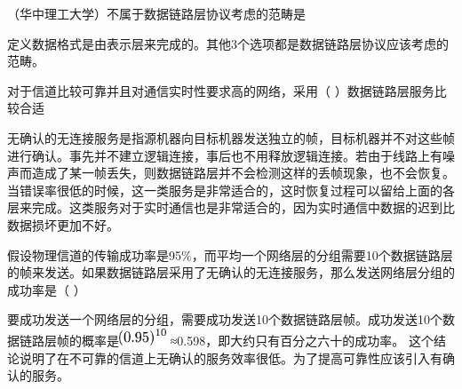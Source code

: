 \question （华中理工大学）不属于数据链路层协议考虑的范畴是
\par{}
\begin{solution}定义数据格式是由表示层来完成的。其他3个选项都是数据链路层协议应该考虑的范畴。
\end{solution}
\question 对于信道比较可靠并且对通信实时性要求高的网络，采用（
）数据链路层服务比较合适
\par{}
\begin{solution}无确认的无连接服务是指源机器向目标机器发送独立的帧，目标机器并不对这些帧进行确认。事先并不建立逻辑连接，事后也不用释放逻辑连接。若由于线路上有噪声而造成了某一帧丢失，则数据链路层并不会检测这样的丢帧现象，也不会恢复。当错误率很低的时候，这一类服务是非常适合的，这时恢复过程可以留给上面的各层来完成。这类服务对于实时通信也是非常适合的，因为实时通信中数据的迟到比数据损坏更加不好。
\end{solution}
\question 假设物理信道的传输成功率是95\%，而平均一个网络层的分组需要10个数据链路层的帧来发送。如果数据链路层采用了无确认的无连接服务，那么发送网络层分组的成功率是（
）
\par{}
\begin{solution}要成功发送一个网络层的分组，需要成功发送10个数据链路层帧。成功发送10个数据链路层帧的概率是\includegraphics[width=0.55208in,height=0.19792in]
{texmath/cb7e655Cdpi7B3507D28095295E7B107D}
≈0.598，即大约只有百分之六十的成功率。
这个结论说明了在不可靠的信道上无确认的服务效率很低。为了提高可靠性应该引入有确认的服务。
\end{solution}
